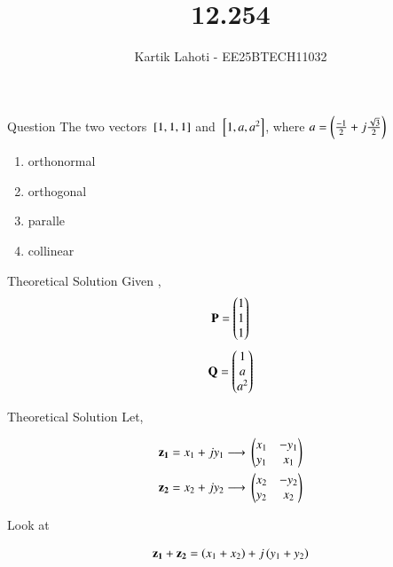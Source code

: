 \documentclass{beamer}
\title %
{12.254}
\author 
{Kartik Lahoti - EE25BTECH11032}
\begin{document}
\frame{\titlepage}
\begin{frame}{Question}
The two vectors ${}\left[1,1,1\right]$ and ${}\left[1,a,a^2\right]$, where $a = \left(\frac{-1}{2} + j\frac{\sqrt{3}}{2}\right)$

\begin{multicols}
\begin{enumerate}
    \item orthonormal
        \item orthogonal
        \item paralle
        \item collinear
\end{enumerate}
\end{multicols}

\end{frame}

\begin{frame}{Theoretical Solution}
Given , 
\begin{align}
    \mathbf{P} = \begin{pmatrix}1\\1\\1\end{pmatrix} 
\end{align}
\begin{align}
    \mathbf{Q} = \begin{pmatrix}1\\a\\a^2\end{pmatrix} 
\end{align}
\end{frame}

\begin{frame}{Theoretical Solution}
Let,

\begin{align}
    \mathbf{z_1}=x_1+jy_1 \longrightarrow{} \begin{pmatrix}x_1 & -y_1 \\ y_1 & x_1 \end{pmatrix}\\ 
    \mathbf{z_2}=x_2+jy_2 \longrightarrow{} \begin{pmatrix}x_2 & -y_2 \\ y_2 & x_2 \end{pmatrix} 
\end{align}

Look at 

\begin{align} 
    \mathbf{z_1} + \mathbf{z_2} = \left(x_1+x_2\right) + j \left(y_1 + y_2\right)
\end{align}

   
\end{frame}
\end{document}

